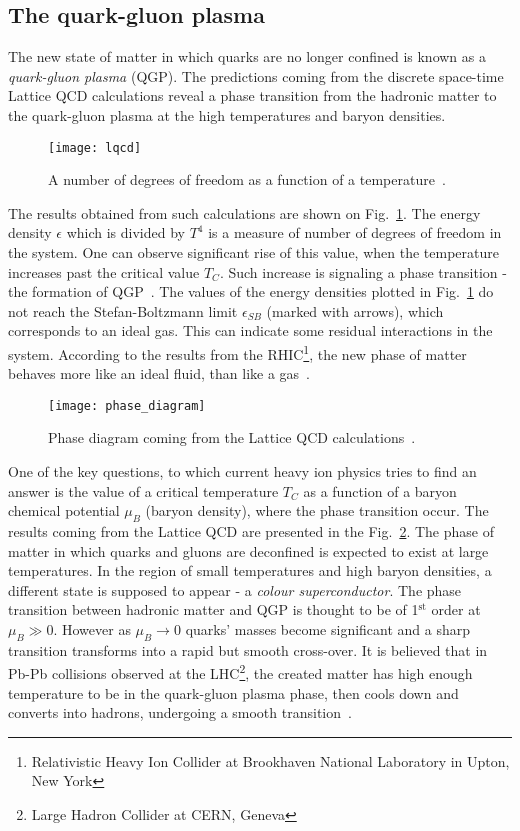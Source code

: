     \subsection{The quark-gluon plasma}
      The new state of matter in which quarks are no longer confined is known as a \textit{quark-gluon plasma} (QGP).
      The predictions coming from the discrete space-time Lattice QCD calculations reveal a phase transition from the hadronic matter to the quark-gluon plasma at the high temperatures and baryon densities.
      \begin{figure}[h]
        \centering
        \texttt{[image: lqcd]}
        \caption{A number of degrees of freedom as a function of a temperature~\cite{karsch}.}
        \label{fig:lqcd}
      \end{figure}
      The results obtained from such calculations are shown on Fig.~\ref{fig:lqcd}.
      The energy density $\epsilon$ which is divided by $T^4$ is a measure of number of degrees of freedom in the system.
      One can observe significant rise of this value, when the temperature increases past the critical value $T_C$.
      Such increase is signaling a phase transition - the formation of QGP~\cite{drkisiel}.
      The values of the energy densities plotted in Fig.~\ref{fig:lqcd} do not reach the Stefan-Boltzmann limit $\epsilon_{SB}$ (marked with arrows), which corresponds to an ideal gas.
      This can indicate some residual interactions in the system.
      According to the results from the RHIC\footnote{Relativistic Heavy Ion Collider at Brookhaven National Laboratory in Upton, New York}, the new phase of matter behaves more like an ideal fluid, than like a gas~\cite{bartke}.
      \begin{figure}[h]
        \centering
        \texttt{[image: phase\_diagram]}
        \caption{Phase diagram coming from the Lattice QCD calculations~\cite{drkisiel}.}
        \label{fig:phase_diagram}
      \end{figure}

      One of the key questions, to which current heavy ion physics tries to find an answer is the value of a critical temperature $T_C$ as a function of a baryon chemical potential $\mu_B$ (baryon density), where the phase transition occur.
      The results coming from the Lattice QCD are presented in the Fig.~\ref{fig:phase_diagram}.
      The phase of matter in which quarks and gluons are deconfined is expected to exist at large temperatures.
      In the region of small temperatures and high baryon densities, a different state is supposed to appear - a \textit{colour superconductor}.
      The phase transition between hadronic matter and QGP is thought to be of 1$^\text{st}$ order at $\mu_B \gg 0$.
      However as $\mu_B \to 0$ quarks' masses become significant and a sharp transition transforms into a rapid but smooth cross-over.
      It is believed that in Pb-Pb collisions observed at the LHC\footnote{Large Hadron Collider at CERN, Geneva}, the created matter has high enough temperature to be in the quark-gluon plasma phase, then cools down and converts into hadrons, undergoing a smooth transition~\cite{drkisiel}.
